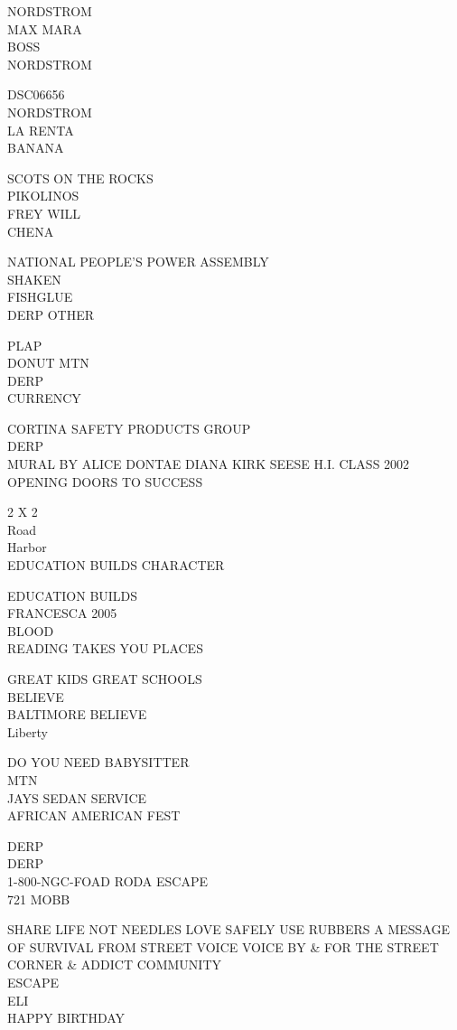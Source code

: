 \documentclass[10pt,letterpaper]{article}
\begin{document}
NORDSTROM\\
MAX MARA\\
BOSS\\
NORDSTROM

DSC06656\\
NORDSTROM\\
LA RENTA\\
BANANA

SCOTS ON THE ROCKS\\
PIKOLINOS\\
FREY WILL\\
CHENA

NATIONAL PEOPLE'S POWER ASSEMBLY\\
SHAKEN\\
FISHGLUE\\
DERP OTHER

PLAP\\
DONUT MTN\\
DERP\\
CURRENCY

CORTINA SAFETY PRODUCTS GROUP\\
DERP\\
MURAL BY ALICE DONTAE DIANA KIRK SEESE H.I. CLASS 2002\\
OPENING DOORS TO SUCCESS

2 X 2\\
Road\\
Harbor\\
EDUCATION BUILDS CHARACTER

EDUCATION BUILDS\\
FRANCESCA 2005\\
BLOOD\\
READING TAKES YOU PLACES

GREAT KIDS GREAT SCHOOLS\\
BELIEVE\\
BALTIMORE BELIEVE\\
Liberty

DO YOU NEED BABYSITTER\\
MTN\\
JAYS SEDAN SERVICE\\
AFRICAN AMERICAN FEST

DERP\\
DERP\\
1{-}800{-}NGC{-}FOAD RODA ESCAPE\\
721 MOBB

SHARE LIFE NOT NEEDLES LOVE SAFELY USE RUBBERS A MESSAGE OF SURVIVAL FROM STREET VOICE VOICE BY \& FOR THE STREET CORNER \& ADDICT COMMUNITY\\
ESCAPE\\
ELI\\
HAPPY BIRTHDAY
\end{document}
